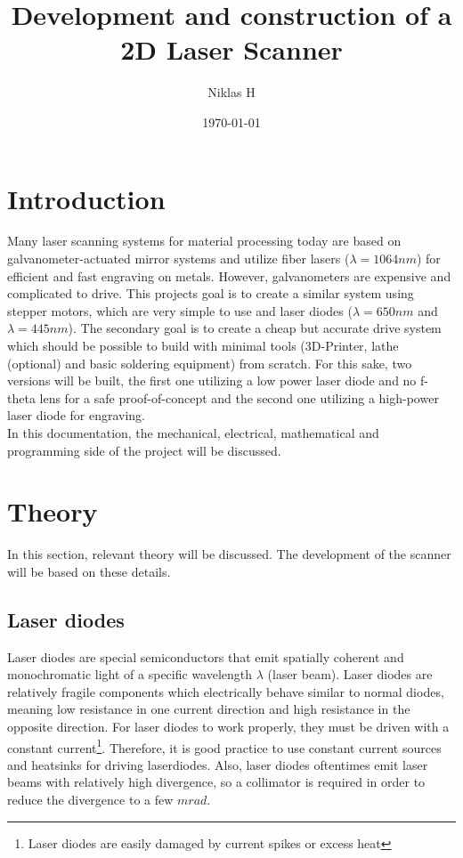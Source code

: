 \documentclass[a4paper, 11pt]{scrartcl}
\title {Development and construction of a 2D Laser Scanner}
\author {Niklas H}
\date {\today}
\begin{document}
\maketitle
\tableofcontents
\newpage
\section{Introduction}
Many laser scanning systems for material processing today are based on galvanometer-actuated mirror systems and utilize fiber lasers ($\lambda = 1064nm$) for efficient and fast engraving on metals. However, galvanometers are expensive and complicated to drive.  This projects goal is to create a similar system using stepper motors, which are very simple to use and laser diodes ($\lambda=650nm$ and $\lambda=445nm$). The secondary goal is to create a cheap but accurate drive system which should be possible to build with minimal tools (3D-Printer, lathe (optional) and basic soldering equipment) from scratch. For this sake, two versions will be built, the first one utilizing a low power laser diode and no f-theta lens for a safe proof-of-concept and the second one utilizing a high-power laser diode for engraving. \\
In this documentation, the mechanical, electrical, mathematical and programming side of the project will be discussed.

\section{Theory}
In this section, relevant theory will be discussed. The development of the scanner will be based on these details. \\
\subsection{Laser diodes} 
Laser diodes are special semiconductors that emit spatially coherent and monochromatic light of a specific wavelength $\lambda$ (laser beam). Laser diodes are relatively fragile components which electrically behave similar to normal diodes, meaning low resistance in one current direction and high resistance in the opposite direction. For laser diodes to work properly, they must be driven with a constant current\footnote{Laser diodes are easily damaged by current spikes or excess heat}. Therefore, it is good practice to use constant current sources and heatsinks for driving laserdiodes. Also, laser diodes oftentimes emit laser beams with relatively high divergence, so a collimator is required in order to reduce the divergence to a few $mrad$. 
\end{document}
